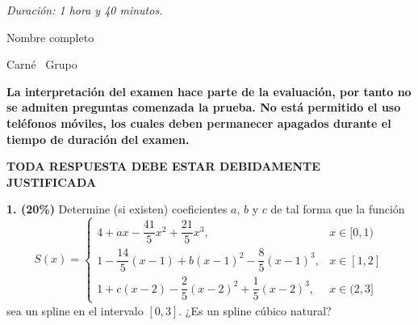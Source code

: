 \documentclass[11pt]{article}
\begin{document}
\examheader

\vspace{4pt}
\noindent\textit{Duración: 1 hora y 40 minutos.}

\vspace{6pt}
\noindent Nombre completo \dotfill

\noindent Carné \dotfill\ Grupo \dotfill

\vspace{8pt}
\noindent\textbf{La interpretación del examen hace parte de la evaluación, por tanto no se admiten preguntas comenzada la prueba. No está permitido el uso teléfonos móviles, los cuales deben permanecer apagados durante el tiempo de duración del examen.}

\vspace{6pt}
\noindent\textbf{TODA RESPUESTA DEBE ESTAR DEBIDAMENTE JUSTIFICADA}

\vspace{10pt}
\noindent\textbf{1. (20\%)} Determine (si existen) coeficientes $a$, $b$ y $c$ de tal forma que la función
\[
S(x)=\begin{cases}
4+ax-\dfrac{41}5x^2+\dfrac{21}5x^3, & x\in[0,1)\\[4pt]
1-\dfrac{14}5(x-1)+b(x-1)^2-\dfrac85(x-1)^3, & x\in[1,2]\\[4pt]
1+c(x-2)-\dfrac25(x-2)^2+\dfrac15(x-2)^3, & x\in(2,3]
\end{cases}
\]
sea un spline en el intervalo $[0,3]$. ¿Es un spline cúbico natural?
\end{document}

